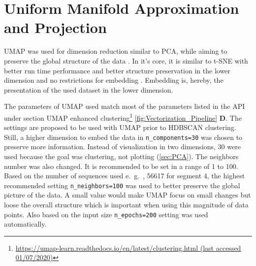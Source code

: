 \section{Uniform Manifold Approximation and Projection} \label{sec:UMAP}

\gls{UMAP} was used for dimension reduction similar to PCA, while aiming to preserve the global structure of the data \autocite{mcinnes_umap_2020}. In it's core, it is similar to \gls{t-SNE} with better run time performance and better structure preservation in the lower dimension and no restrictions for embedding \autocite{maaten_visualizing_2008, mcinnes_umap_2020}. Embedding is, hereby, the presentation of the used dataset in the lower dimension.

The parameters of \gls{UMAP} used match most of the parameters listed in the API under section \glqq \gls{UMAP} enhanced clustering\grqq{}\footnote{\url{https://umap-learn.readthedocs.io/en/latest/clustering.html (last accessed 01/07/2020)}} \autoref{fig:Vectorization_Pipeline} \textsf{\textbf{D}}. The settings are proposed to be used with \gls{UMAP} prior to \gls{HDBSCAN} clustering. Still, a higher dimension to embed the data in \texttt{n\_components=30} was chosen to preserve more information. Instead of visualization in two dimensions, 30 were used because the goal was clustering, not plotting (\autoref{sec:PCA}). The neighbors number was also changed. It is recommended to be set in a range of 1 to 100. Based on the number of sequences used e.~g.~, 56617 for segment 4, the highest recommended setting \texttt{n\_neighbors=100} was used to better preserve the global picture of the data. A small value would make \gls{UMAP} focus on small changes but loose the overall structure which is important when using this magnitude of data points. Also based on the input size \texttt{n\_epochs=200} setting was used automatically.




